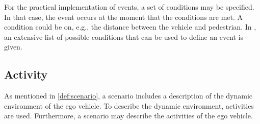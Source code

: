 \cbstartb
For the practical implementation of events, a set of conditions may be specified. In that case, the event occurs at the moment that the conditions are met. A condition could be on, e.g., the distance between the vehicle and pedestrian. In \cite{openscenario}, an extensive list of possible conditions that can be used to define an event is given.
\cbend






\subsection{Activity}
\label{sec:activity}

As mentioned in \cref{def:scenario}, a scenario \cbstartb includes \cbend a description of the dynamic environment of the ego vehicle. To describe the dynamic environment, activities are used. Furthermore, a scenario may describe the activities of the ego vehicle. 


